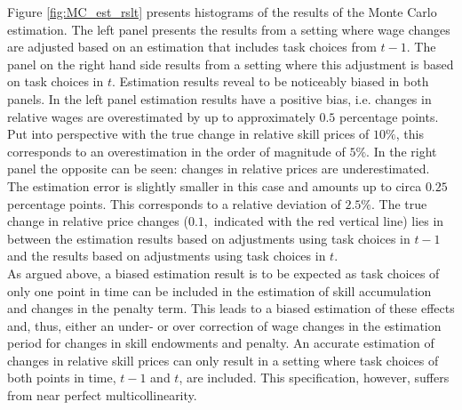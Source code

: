 \documentclass[../main.tex]{subfiles}
\begin{document}
Figure \ref{fig:MC_est_rslt} presents histograms of the results of the Monte Carlo estimation. The left panel presents the results from a setting where wage changes are adjusted based on an estimation that includes task choices from $t-1$. The panel on the right hand side results from a setting where this adjustment is based on task choices in $t$. Estimation results reveal to be noticeably biased in both panels. In the left panel estimation results have a positive bias, i.e. changes in relative wages are overestimated by up to approximately $0.5$ percentage points. Put into perspective with the true change in relative skill prices of $10 \%$, this corresponds to an overestimation in the order of magnitude of $5 \%$. In the right panel the opposite can be seen: changes in relative prices are underestimated. The estimation error is slightly smaller in this case and amounts up to circa $0.25$ percentage points. This corresponds to a relative deviation of $2.5 \%$. The true change in relative price changes ($0.1,$ indicated with the red vertical line) lies in between the estimation results based on adjustments using task choices in $t-1$ and the results based on adjustments using task choices in $t$.
\\
As argued above, a biased estimation result is to be expected as task choices of only one point in time can be included in the estimation of skill accumulation and changes in the penalty term. This leads to a biased estimation of these effects and, thus, either an under- or over correction of wage changes in the estimation period for changes in skill endowments and penalty. An accurate estimation of changes in relative skill prices can only result in a setting where task choices of both points in time, $t-1$ and $t$, are included. This specification, however, suffers from near perfect multicollinearity.
\end{document}
